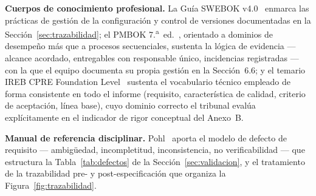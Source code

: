 \documentclass[11pt,a4paper]{article}
\begin{document}
\textbf{Cuerpos de conocimiento profesional.} La Guía SWEBOK v4.0~\cite{swebok4} enmarca las
prácticas de gestión de la configuración y control de versiones documentadas en la
Sección~\ref{sec:trazabilidad}; el PMBOK 7.\textsuperscript{a}~ed.~\cite{pmbok7}, orientado a
dominios de desempeño más que a procesos secuenciales, sustenta la lógica de evidencia --- alcance
acordado, entregables con responsable único, incidencias registradas --- con la que el equipo
documenta su propia gestión en la Sección~6.6; y el temario IREB CPRE Foundation
Level~\cite{ireb2026} sustenta el vocabulario técnico empleado de forma consistente en todo el
informe (requisito, característica de calidad, criterio de aceptación, línea base), cuyo dominio
correcto el tribunal evalúa explícitamente en el indicador de rigor conceptual del Anexo~B.

\textbf{Manual de referencia disciplinar.} Pohl~\cite{pohl2025} aporta el modelo de defecto de
requisito --- ambigüedad, incompletitud, inconsistencia, no verificabilidad --- que estructura la
Tabla~\ref{tab:defectos} de la Sección~\ref{sec:validacion}, y el tratamiento de la trazabilidad
pre- y post-especificación que organiza la Figura~\ref{fig:trazabilidad}.
\end{document}
